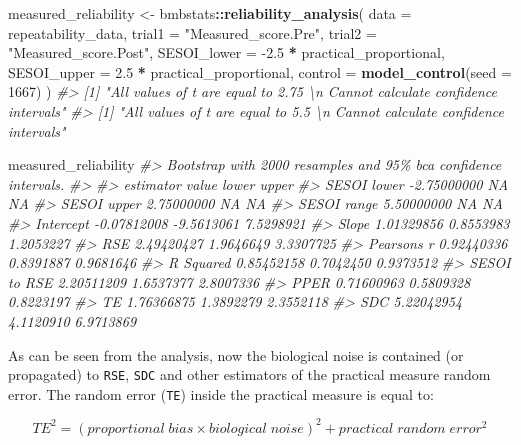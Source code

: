 \documentclass[
]{book}
\newenvironment{Shaded}{\begin{snugshade}}{\end{snugshade}}
\newcommand{\CommentTok}[1]{\textcolor[rgb]{0.56,0.35,0.01}{\textit{#1}}}
\newcommand{\DataTypeTok}[1]{\textcolor[rgb]{0.13,0.29,0.53}{#1}}
\newcommand{\DecValTok}[1]{\textcolor[rgb]{0.00,0.00,0.81}{#1}}
\newcommand{\FloatTok}[1]{\textcolor[rgb]{0.00,0.00,0.81}{#1}}
\newcommand{\KeywordTok}[1]{\textcolor[rgb]{0.13,0.29,0.53}{\textbf{#1}}}
\newcommand{\NormalTok}[1]{#1}
\newcommand{\OperatorTok}[1]{\textcolor[rgb]{0.81,0.36,0.00}{\textbf{#1}}}
\newcommand{\StringTok}[1]{\textcolor[rgb]{0.31,0.60,0.02}{#1}}
\begin{document}
\begin{Shaded}
\begin{Highlighting}[]
\NormalTok{measured\_reliability <{-}}\StringTok{ }\NormalTok{bmbstats}\OperatorTok{::}\KeywordTok{reliability\_analysis}\NormalTok{(}
  \DataTypeTok{data =}\NormalTok{ repeatability\_data,}
  \DataTypeTok{trial1 =} \StringTok{"Measured\_score.Pre"}\NormalTok{,}
  \DataTypeTok{trial2 =} \StringTok{"Measured\_score.Post"}\NormalTok{,}
  \DataTypeTok{SESOI\_lower =} \FloatTok{{-}2.5} \OperatorTok{*}\StringTok{ }\NormalTok{practical\_proportional,}
  \DataTypeTok{SESOI\_upper =} \FloatTok{2.5} \OperatorTok{*}\StringTok{ }\NormalTok{practical\_proportional,}
  \DataTypeTok{control =} \KeywordTok{model\_control}\NormalTok{(}\DataTypeTok{seed =} \DecValTok{1667}\NormalTok{)}
\NormalTok{)}
\CommentTok{\#> [1] "All values of t are equal to  2.75 \textbackslash{}n Cannot calculate confidence intervals"}
\CommentTok{\#> [1] "All values of t are equal to  5.5 \textbackslash{}n Cannot calculate confidence intervals"}

\NormalTok{measured\_reliability}
\CommentTok{\#> Bootstrap with 2000 resamples and 95\% bca confidence intervals.}
\CommentTok{\#> }
\CommentTok{\#>     estimator       value      lower     upper}
\CommentTok{\#>   SESOI lower {-}2.75000000         NA        NA}
\CommentTok{\#>   SESOI upper  2.75000000         NA        NA}
\CommentTok{\#>   SESOI range  5.50000000         NA        NA}
\CommentTok{\#>     Intercept {-}0.07812008 {-}9.5613061 7.5298921}
\CommentTok{\#>         Slope  1.01329856  0.8553983 1.2053227}
\CommentTok{\#>           RSE  2.49420427  1.9646649 3.3307725}
\CommentTok{\#>   Pearson\textquotesingle{}s r  0.92440336  0.8391887 0.9681646}
\CommentTok{\#>     R Squared  0.85452158  0.7042450 0.9373512}
\CommentTok{\#>  SESOI to RSE  2.20511209  1.6537377 2.8007336}
\CommentTok{\#>          PPER  0.71600963  0.5809328 0.8223197}
\CommentTok{\#>            TE  1.76366875  1.3892279 2.3552118}
\CommentTok{\#>           SDC  5.22042954  4.1120910 6.9713869}
\end{Highlighting}
\end{Shaded}

As can be seen from the analysis, now the biological noise is contained (or propagated) to \texttt{RSE}, \texttt{SDC} and other estimators of the practical measure random error. The random error (\texttt{TE}) inside the practical measure is equal to:

\begin{equation}
  TE^2 = (proportional \; bias \times biological \; noise)^2 + practical \; random \; error ^2 
\end{equation}
\end{document}
